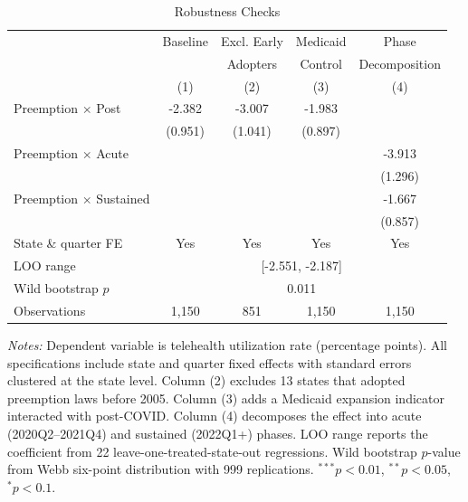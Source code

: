 \begin{table}[htbp]
\centering
\begin{threeparttable}
\caption{Robustness Checks}
\label{tab:robust}
\begin{tabular}{lcccc}
\toprule
 & Baseline & Excl. Early & Medicaid & Phase \\
 & & Adopters & Control & Decomposition \\
 & (1) & (2) & (3) & (4) \\
\midrule
Preemption $\times$ Post & -2.382 & -3.007 & -1.983 & \\
 & (0.951) & (1.041) & (0.897) & \\
Preemption $\times$ Acute & & & & -3.913 \\
 & & & & (1.296) \\
Preemption $\times$ Sustained & & & & -1.667 \\
 & & & & (0.857) \\
\midrule
State \& quarter FE & Yes & Yes & Yes & Yes \\
LOO range & \multicolumn{4}{c}{[-2.551, -2.187]} \\
Wild bootstrap $p$ & \multicolumn{4}{c}{0.011} \\
Observations & 1,150 & 851 & 1,150 & 1,150 \\
\bottomrule
\end{tabular}
\begin{tablenotes}[flushleft]\footnotesize
\item \textit{Notes:} Dependent variable is telehealth utilization rate (percentage points). All specifications include state and quarter fixed effects with standard errors clustered at the state level. Column (2) excludes 13 states that adopted preemption laws before 2005. Column (3) adds a Medicaid expansion indicator interacted with post-COVID. Column (4) decomposes the effect into acute (2020Q2--2021Q4) and sustained (2022Q1+) phases. LOO range reports the coefficient from 22 leave-one-treated-state-out regressions. Wild bootstrap $p$-value from Webb six-point distribution with 999 replications. $^{***}p<0.01$, $^{**}p<0.05$, $^{*}p<0.1$.
\end{tablenotes}
\end{threeparttable}
\end{table}

